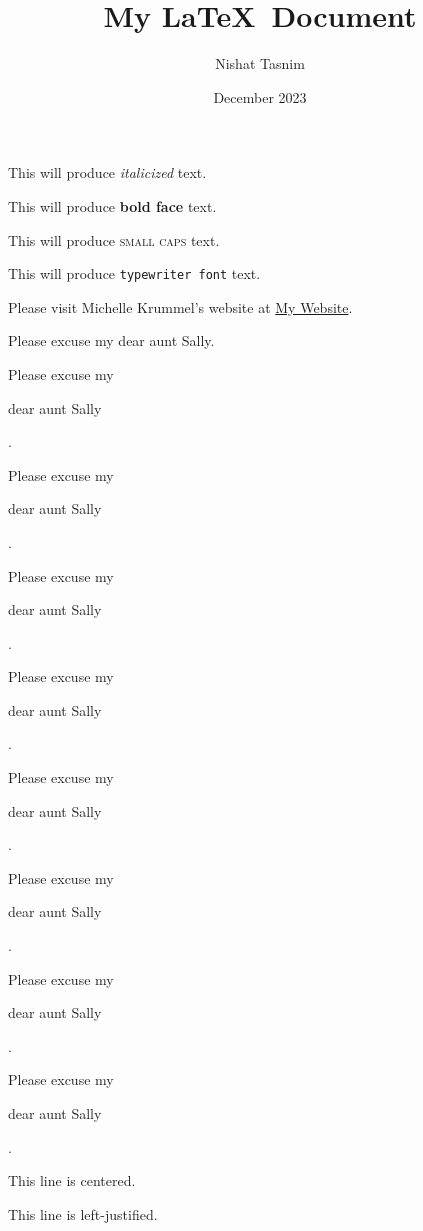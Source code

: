 \documentclass[11pt]{article}
\title{My \LaTeX\ Document}
\author{Nishat Tasnim}
\date{December 2023}
\begin{document}
\tableofcontents
\maketitle

This will produce \textit{italicized} text.

This will produce \textbf{bold face} text.

This will produce \textsc{small caps} text.

This will produce \texttt{typewriter font} text.

Please visit Michelle Krummel's website at \href{http://michellekrummel.com}{My Website}.

\vspace{1cm}

Please excuse my dear aunt Sally.

Please excuse my \begin{large}dear aunt Sally\end{large}.

Please excuse my \begin{Large}dear aunt Sally\end{Large}.

Please excuse my \begin{huge}dear aunt Sally\end{huge}.

Please excuse my \begin{Huge}dear aunt Sally\end{Huge}.

Please excuse my \begin{normalsize}dear aunt Sally\end{normalsize}.

Please excuse my \begin{small}dear aunt Sally\end{small}.

Please excuse my \begin{scriptsize}dear aunt Sally\end{scriptsize}.

Please excuse my \begin{tiny}dear aunt Sally\end{tiny}.

\vspace{1cm}

\begin{center}This line is centered.\end{center}

\begin{flushleft}This line is left-justified.\end{flushleft}
\end{document}
